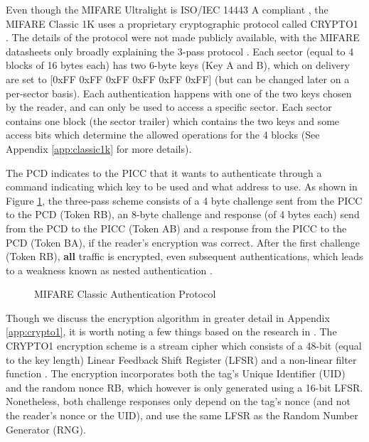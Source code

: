 \documentclass[fleqn,10pt]{SelfArx} %
\begin{document}
Even though the MIFARE Ultralight is ISO/IEC 14443 A compliant \cite{ultralight}, the MIFARE Classic 1K uses a proprietary cryptographic protocol called CRYPTO1 \cite{classic1k}. The details of the protocol were not made publicly available, with the MIFARE datasheets only broadly explaining the 3-pass protocol \cite{classic1k}. Each sector (equal to 4 blocks of 16 bytes each) has two 6-byte keys (Key A and B), which on delivery are set to [0xFF 0xFF 0xFF 0xFF 0xFF 0xFF] (but can be changed later on a per-sector basis). Each authentication happens with one of the two keys chosen by the reader, and can only be used to access a specific sector. Each sector contains one block (the sector trailer) which contains the two keys and some access bits which determine the allowed operations for the 4 blocks (See Appendix \ref{app:classic1k} for more details).


The PCD indicates to the PICC that it wants to authenticate through a command indicating which key to be used and what address to use. As shown in Figure \ref{fig:auth}, the three-pass scheme consists of a 4 byte challenge sent from the PICC to the PCD  (Token RB), an 8-byte challenge and response (of 4 bytes each) send from the PCD to the PICC (Token AB) and a response from the PICC to the PCD (Token BA), if the reader's encryption was correct. After the first challenge (Token RB), {\bf all} traffic is encrypted, even subsequent authentications, which leads to a weakness known as nested authentication \cite{classicvulnerabilities}.

\begin{figure}
\centering
\begin{sequencediagram}
\end{sequencediagram}
\caption{MIFARE Classic Authentication Protocol}
\label{fig:auth}
\end{figure}

Though we discuss the encryption algorithm in greater detail in Appendix \ref{app:crypto1}, it is worth noting a few things based on the research in \cite{crypto1, classicvulnerabilities}. The CRYPTO1 encryption scheme is a stream cipher which consists of a 48-bit (equal to the key length) Linear Feedback Shift Register (LFSR) and a non-linear filter function \cite{crypto1}. The encryption incorporates both the tag's Unique Identifier (UID) and the random nonce RB, which however is only generated using a 16-bit LFSR. Nonetheless, both challenge responses only depend on the tag's nonce (and not the reader's nonce or the UID), and use the same LFSR as the Random Number Generator (RNG). 
\end{document}

